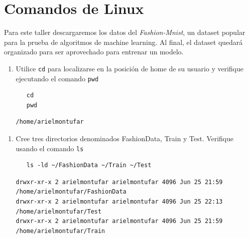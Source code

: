 \documentclass{article}
\begin{document}
\section{Comandos de Linux}
\label{sec:orgfe75a79}
Para este taller descargaremos los datos del \emph{Fashion-Mnist}, un
dataset popular para la prueba de algoritmos de machine learning. Al
final, el dataset quedará organizado para ser aprovechado para
entrenar un modelo.

\begin{enumerate}
\item Utilice \texttt{cd} para localizarse en la posición de home de su usuario y
verifique ejecutando el comando \texttt{pwd}

\begin{verbatim}
   cd
   pwd
\end{verbatim}

\begin{verbatim}
/home/arielmontufar
\end{verbatim}
\end{enumerate}



\begin{enumerate}
\item Cree tres directorios denominados FashionData, Train y
Test. Verifique usando el comando \texttt{ls}
\begin{verbatim}
   ls -ld ~/FashionData ~/Train ~/Test
\end{verbatim}

\begin{verbatim}
drwxr-xr-x 2 arielmontufar arielmontufar 4096 Jun 25 21:59 /home/arielmontufar/FashionData
drwxr-xr-x 2 arielmontufar arielmontufar 4096 Jun 25 22:13 /home/arielmontufar/Test
drwxr-xr-x 2 arielmontufar arielmontufar 4096 Jun 25 21:59 /home/arielmontufar/Train
\end{verbatim}
\end{enumerate}
\end{document}
